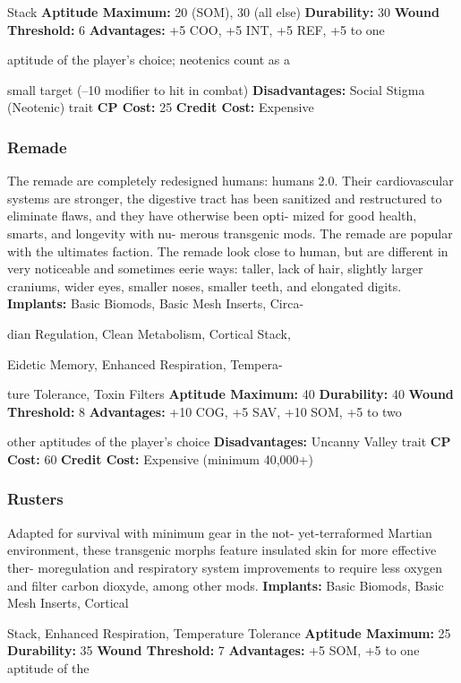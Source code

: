 Stack
\textbf{Aptitude Maximum: }20 (SOM), 30 (all else)
\textbf{Durability: }30
\textbf{Wound Threshold: }6
\textbf{Advantages:  }+5 COO, +5 INT, +5 REF, +5 to one 

aptitude of the player's choice; neotenics count as a 

small target (–10 modifier to hit in combat)
\textbf{Disadvantages: }Social Stigma (Neotenic) trait
\textbf{CP Cost:} 25
\textbf{Credit Cost: }Expensive

\subsubsection{Remade}

The remade are completely redesigned humans: 
humans 2.0. Their cardiovascular systems are stronger, 
the digestive tract has been sanitized and restructured 
to eliminate flaws, and they have otherwise been opti-
mized for good health, smarts, and longevity with nu-
merous transgenic mods. The remade are popular with 
the ultimates faction. The remade look close to human, 
but are different in very noticeable and sometimes eerie 
ways: taller, lack of hair, slightly larger craniums, wider 
eyes, smaller noses, smaller teeth, and elongated digits.
\textbf{Implants: }Basic Biomods, Basic Mesh Inserts, Circa-

dian Regulation, Clean Metabolism, Cortical Stack, 

Eidetic Memory, Enhanced Respiration, Tempera-

ture Tolerance, Toxin Filters
\textbf{Aptitude Maximum: }40
\textbf{Durability:} 40
\textbf{Wound Threshold: }8
\textbf{Advantages:} +10 COG, +5 SAV, +10 SOM, +5 to two 

other aptitudes of the player's choice
\textbf{Disadvantages: }Uncanny Valley trait
\textbf{CP Cost:} 60
\textbf{Credit Cost: }Expensive (minimum 40,000+)

\subsubsection{Rusters}

Adapted for survival with minimum gear in the not-
yet-terraformed Martian environment, these transgenic 
morphs feature insulated skin for more effective ther-
moregulation and respiratory system improvements to 
require less oxygen and filter carbon dioxyde, among 
other mods.
\textbf{Implants: }Basic Biomods, Basic Mesh Inserts, Cortical 

Stack, Enhanced Respiration, Temperature Tolerance
\textbf{Aptitude Maximum: }25
\textbf{Durability: }35
\textbf{Wound Threshold: }7
\textbf{Advantages:} +5 SOM, +5 to one aptitude of the 

